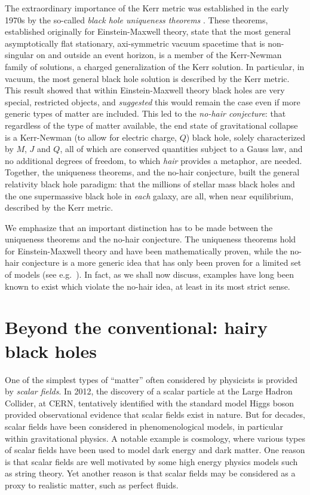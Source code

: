 The extraordinary importance of the Kerr metric was established in the early 1970s by the so-called \textit{black hole uniqueness theorems} \cite{Robinson:2004zz}.
These theorems, established originally for Einstein-Maxwell theory, state that the most general asymptotically flat stationary, axi-symmetric vacuum spacetime that is non-singular on and outside an event horizon, is a member of the Kerr-Newman family of solutions, a charged generalization of the Kerr solution.
In particular, in vacuum, the most general black hole solution is described by the Kerr metric.
This result showed that within Einstein-Maxwell theory black holes are very special, restricted objects, and \textit{suggested} this would remain the case even if more generic types of matter are included.
This led to the \textit{no-hair conjecture}: that regardless of the type of matter available, the end state of gravitational collapse is a Kerr-Newman (to allow for electric charge, $Q$) black hole, solely characterized by $M$, $J$ and $Q$, all of which are conserved quantities subject to a Gauss law, and no additional degrees of freedom, to which \textit{hair} provides a metaphor, are needed.
Together, the uniqueness theorems, and the no-hair conjecture, built the general relativity black hole paradigm: that the millions of stellar mass black holes and the one supermassive black hole in \textit{each} galaxy, are all, when near equilibrium, described by the Kerr metric.  

We emphasize that an important distinction has to be made between the uniqueness theorems and the no-hair conjecture.
The uniqueness theorems hold for Einstein-Maxwell theory and have been mathematically proven, while the no-hair conjecture is a more generic idea that has only been proven for a limited set of models (see e.g.~\cite{Bekenstein:1996pn}).
In fact, as we shall now discuss, examples have long been known to exist which violate the no-hair idea, at least in its most strict sense.
\section{Beyond the conventional: hairy black holes}
\label{sec:bh_beyond_gr}

One of the simplest types of ``matter'' often considered by physicists is provided by \textit{scalar fields}.
In 2012, 
the discovery of a scalar particle at the Large Hadron Collider, at CERN, tentatively identified with the standard model Higgs boson~\cite{Aad:2012tfa,Chatrchyan:2012ufa} provided observational evidence that scalar fields exist in nature. 
But for decades, scalar fields have been considered in phenomenological models, in particular within gravitational physics.
A notable example is cosmology, where various types of scalar fields have been used to model dark energy and dark matter.
One reason is that scalar fields are well motivated by some high energy physics models such as string theory.
Yet another reason is that scalar fields may be considered as a proxy to realistic matter, such as perfect fluids.

